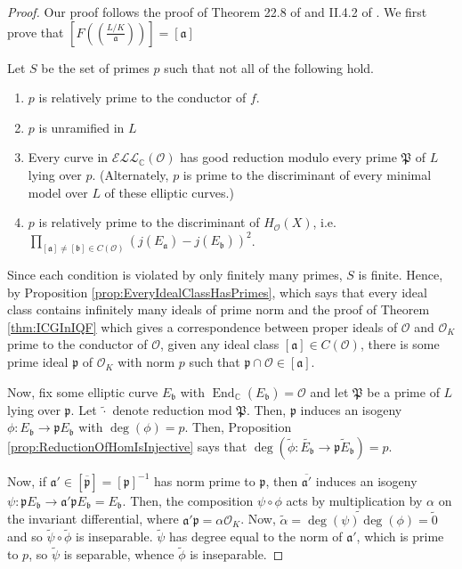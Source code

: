 \documentclass{amsart}
\theoremstyle{definition}
\theoremstyle{remark}
\numberwithin{equation}{section}
\newcommand{\cE}{\mathcal E}
\newcommand{\cL}{\mathcal L}
\newcommand{\cO}{\mathcal O}
\newcommand{\fka}{\mathfrak a}
\newcommand{\fkb}{\mathfrak b}
\newcommand{\fkp}{\mathfrak p}
\newcommand{\fkP}{\mathfrak{P}}
\newcommand{\bbC}{\mathbb C}
\newcommand{\inv}{^{-1}}
\newcommand{\ELL}{\cE\cL\cL}
\newcommand{\artin}[2]{\left( \frac{#1}{#2}\right)}
\DeclareMathOperator{\End}{End}
\begin{document}
\begin{proof}
 Our proof follows the proof of Theorem 22.8 of \cite{SutherlandLN}
  and II.4.2 of \cite{SilvermanATAEC}. We first prove that $\left[F\left(\artin{L/K}{\fka}\right)\right] = [\fka]$ 
 
 Let $S$ be the set of primes $p$ such that not all of the following hold.
 \begin{enumerate}
 \item $p$ is relatively prime to the conductor of $f$.
 \item $p$ is unramified in $L$
 \item Every curve in $\ELL_{\bbC}(\cO)$ has good reduction modulo every prime $\fkP$ of $L$ lying over $p$. (Alternately, $p$ is prime to the discriminant of every minimal model over $L$ of these elliptic curves.)
 \item $p$ is relatively prime to the discriminant of $H_{\cO}(X)$, i.e. $\prod_{[\fka] \neq [\fkb] \in C(\cO)} (j(E_{\fka}) - j(E_{\fkb}))^2$.
 \end{enumerate}
 Since each condition is violated by only finitely many primes, $S$ is finite. Hence, by Proposition \ref{prop:EveryIdealClassHasPrimes}, which says that every ideal class contains infinitely many ideals of prime norm and the proof of Theorem \ref{thm:ICGInIQF} which gives a correspondence between proper ideals of $\cO$ and $\cO_{K}$ prime to the conductor of $\cO$, given any ideal class $[\fka] \in C(\cO)$, there is some prime ideal $\fkp$ of $\cO_{K}$ with norm $p$ such that $\fkp \cap \cO \in [\fka]$.
 
 Now, fix some elliptic curve $E_{\fkb}$ with $\End_{\bbC}(E_{\fkb}) = \cO$ and let $\fkP$ be a prime of $L$ lying over $\fkp$. Let $\widetilde{\cdot}$ denote reduction mod $\fkP$. Then, $\fkp$ induces an isogeny $\phi: E_{\fkb} \to \fkp E_{\fkb}$ with $\deg(\phi) = p$. Then, Proposition \ref{prop:ReductionOfHomIsInjective} says that $\deg(\widetilde{\phi}: \widetilde{E_{\fkb}} \to \widetilde{\fkp E_{\fkb}}) = p$. 
 
 Now, if $\fka' \in [\overline{\fkp}] = [\fkp]\inv$ has norm prime to $\fkp$, then $\overline{\fka'}$ induces an isogeny $\psi: \fkp E_{\fkb} \to \fka' \fkp E_{\fkb} = E_{\fkb}$. Then, the composition $\psi \circ \phi$ acts by multiplication by $\alpha$ on the invariant differential, where $\fka' \fkp = \alpha \cO_{K}$. Now, $\widetilde{\alpha} = \widetilde{\deg(\psi)\deg(\phi)} = \widetilde{0}$ and so $\widetilde{\psi} \circ \widetilde{\phi}$ is inseparable. $\widetilde{\psi}$ has degree equal to the norm of $\fka'$, which is prime to $p$, so  $\widetilde{\psi}$ is separable, whence $\widetilde{\phi}$ is inseparable.
 

\end{proof}
\end{document}
